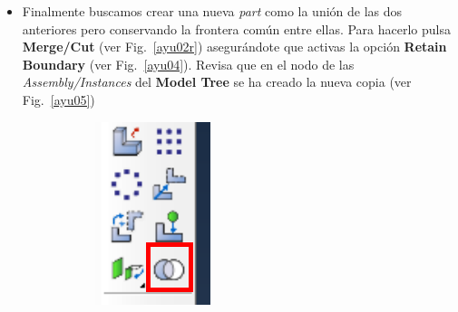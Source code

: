 \begin{itemize}
\item Finalmente buscamos crear una nueva \textit{part} como la unión
  de las dos anteriores pero conservando la frontera común entre
  ellas. Para hacerlo pulsa \textbf{Merge/Cut} (ver Fig.~\ref{ayu02r})
  asegurándote que activas la opción \textbf{Retain Boundary} (ver
  Fig.~\ref{ayu04}). Revisa que en el nodo de las
  \textit{Assembly/Instances} del \textbf{Model Tree} se ha creado la
  nueva copia (ver Fig.~\ref{ayu05})

  \begin{figure}[!h]
    \centering
    \begin{subfigure}[!h]{0.15\textwidth}
      \includegraphics[width=\textwidth]{./body/images/ayu02r}

\end{subfigure}
\end{figure}
\end{itemize}
